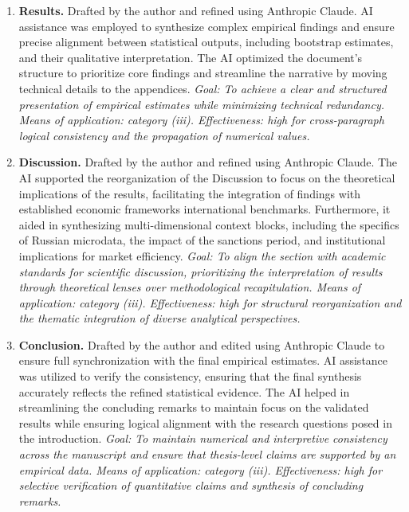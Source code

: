 \documentclass[a4paper, 12pt]{article}
\begin{document}
\begin{enumerate}
    \item \textbf{Results.} 
    Drafted by the author and refined using Anthropic Claude. AI assistance was employed to synthesize complex empirical findings and ensure precise alignment between statistical outputs, including bootstrap estimates, and their qualitative interpretation. The AI optimized the document’s structure to prioritize core findings and streamline the narrative by moving technical details to the appendices.
    \emph{Goal: To achieve a clear and structured presentation of empirical estimates while minimizing technical redundancy. Means of application: category (iii). Effectiveness: high for cross-paragraph logical consistency and the propagation of numerical values.}

    \item \textbf{Discussion.} 
    Drafted by the author and refined using Anthropic Claude. The AI supported the reorganization of the Discussion to focus on the theoretical implications of the results, facilitating the integration of findings with established economic frameworks international benchmarks. Furthermore, it aided in synthesizing multi-dimensional context blocks, including the specifics of Russian microdata, the impact of the sanctions period, and institutional implications for market efficiency.
    \emph{Goal: To align the section with academic standards for scientific discussion, prioritizing the interpretation of results through theoretical lenses over methodological recapitulation. Means of application: category (iii). Effectiveness: high for structural reorganization and the thematic integration of diverse analytical perspectives.}

    \item \textbf{Conclusion.} 
    Drafted by the author and edited using Anthropic Claude to ensure full synchronization with the final empirical estimates. AI assistance was utilized to verify the consistency, ensuring that the final synthesis accurately reflects the refined statistical evidence. The AI helped in streamlining the concluding remarks to maintain focus on the validated results while ensuring logical alignment with the research questions posed in the introduction.
    \emph{Goal: To maintain numerical and interpretive consistency across the manuscript and ensure that thesis-level claims are supported by an empirical data. Means of application: category (iii). Effectiveness: high for selective verification of quantitative claims and synthesis of concluding remarks.}


\end{enumerate}
\end{document}
